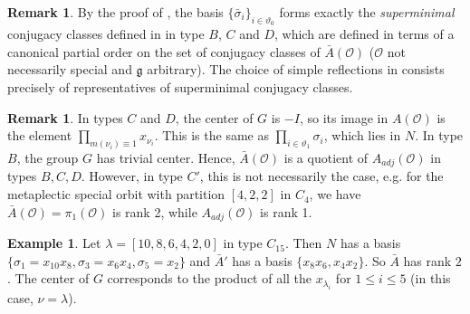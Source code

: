 \documentclass{amsart}
\theoremstyle{definition}
\newtheorem{example}[theorem]{Example}
\newtheorem{remark}[theorem]{Remark}
\newcommand{\g}{\mathfrak{g}}
\newcommand{\Ab}{\bar{A}}
\newcommand{\0}{\mathcal{O}}
\begin{document}
\begin{remark}
	By the proof of \cite[Proposition 5.3]{Achar-Aubert}, the basis $\{ \bar{\sigma}_i \}_{i \in \vartheta_0}$ forms exactly the \emph{superminimal} conjugacy classes defined in \cite[\S\,7.1]{Achar-duality} in type $B$, $C$ and $D$, which are defined in terms of a canonical partial order on the set of conjugacy classes of $\Ab(\0)$ ($\0$ not necessarily special and $\g$ arbitrary). 
    The choice of simple reflections in \cite{Achar-Sommers} consists precisely of representatives of superminimal conjugacy classes. 
\end{remark}


\begin{remark}\label{remark:center_G_in_Abar}
In types $C$ and $D$, the center of $G$ is $-I$, so its image in $A(\0)$ is the element 
$\prod_{m(\nu_i) \equiv 1} x_{\nu_i}$.  This is the same as $\prod_{i \in \vartheta_1} \sigma_i$, which lies in $N$. In type $B$, the group $G$ has trivial center.
Hence, $\Ab(\0)$ is a quotient of $A_{adj}(\0)$ in types $B,C,D$.
However, in type $C'$, this is not necessarily the case, e.g. for the metaplectic special orbit with partition $[4,2,2]$ in $C_4$, we have $\Ab(\0) = \pi_1(\0)$ is rank 2, while $A_{adj}(\0)$ is rank 1.
\end{remark}





\begin{example}\label{example:C15}
Let $\lambda = [10,8,6,4,2,0]$ in type $C_{15}$.  
Then $N$ has a basis $\{\sigma_1 = x_{10}x_8, \sigma_3=x_6x_4, \sigma_5 = x_2\}$ and $\Ab'$
has a basis $\{x_8x_6, x_4x_2\}$.  So $\Ab$
has rank $2$.  The center of $G$ corresponds 
to the product of all the $x_{\lambda_i}$ for $1 \leq i \leq 5$
(in this case, $\nu = \lambda$).
\end{example}
\end{document}
